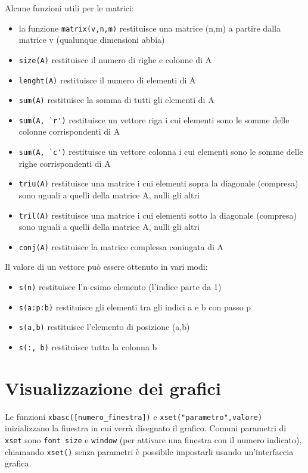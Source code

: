 Alcune funzioni utili per le matrici:
\begin{itemize}
\item la funzione \verb+matrix(v,n,m)+ restituisce una matrice (n,m) a partire dalla matrice v (qualunque dimensioni abbia)
\item \verb+size(A)+ restituisce il numero di righe e colonne di A
\item \verb+lenght(A)+ restituisce il numero di elementi di A
\item \verb+sum(A)+ restituisce la somma di tutti gli elementi di A
\item \verb+sum(A, `r')+ restituisce un vettore riga i cui elementi sono le somme delle colonne corrispondenti di A
\item \verb+sum(A, `c')+ restituisce un vettore colonna i cui elementi sono le somme delle righe corrispondenti di A
\item \verb+triu(A)+ restituisce una matrice i cui elementi sopra la diagonale (compresa) sono uguali a quelli della matrice A, nulli gli altri
\item \verb+tril(A)+ restituisce una matrice i cui elementi sotto la diagonale (compresa) sono uguali a quelli della matrice A, nulli gli altri
\item \verb+conj(A)+ restituisce la matrice complessa coniugata di A
\end{itemize}

Il valore di un vettore pu\`o essere ottenuto in vari modi:
\begin{itemize}
\item \verb+s(n)+ restituisce l'n-esimo elemento (l'indice parte da 1)
\item \verb+s(a:p:b)+ restituisce gli elementi tra gli indici a e b con passo p
\item \verb+s(a,b)+ restituisce l'elemento di posizione (a,b)
\item \verb+s(:, b)+ restituisce tutta la colonna b
\end{itemize}

\section{Visualizzazione dei grafici}
Le funzioni \verb+xbasc([numero_finestra])+ e \verb+xset("parametro",valore)+ inizializzano la finestra in cui verr\`a disegnato il grafico. Comuni parametri di \verb+xset+ sono \verb+font size+ e \verb+window+ (per attivare una finestra con il numero indicato), chiamando \verb+xset()+ senza parametri \`e possibile impostarli usando un'interfaccia grafica.

